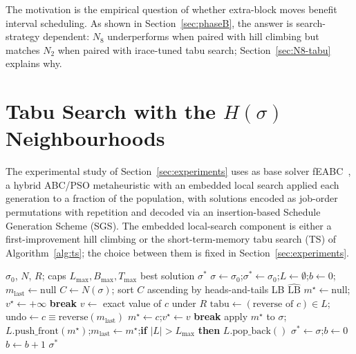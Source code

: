 \documentclass[preprint,12pt]{elsarticle}
\begin{document}
The motivation is the empirical question of whether extra-block moves benefit interval scheduling. As shown in Section~\ref{sec:phaseB}, the answer is search-strategy dependent: $N_8$ underperforms when paired with hill climbing but matches $N_2$ when paired with irace-tuned tabu search; Section~\ref{sec:N8-tabu} explains why.

\section{Tabu Search with the $H(\sigma)$ Neighbourhoods}
\label{sec:ts}

The experimental study of Section~\ref{sec:experiments} uses as base solver fEABC~\cite{DiazFEABC2023}, a hybrid ABC/PSO metaheuristic with an embedded local search applied each generation to a fraction of the population, with solutions encoded as job-order permutations with repetition and decoded via an insertion-based Schedule Generation Scheme (SGS). The embedded local-search component is either a first-improvement hill climbing or the short-term-memory tabu search (TS) of Algorithm~\ref{alg:ts}; the choice between them is fixed in Section~\ref{sec:experiments}.

\begin{algorithm}[H]
\caption{Tabu search with the $H(\sigma)$ neighbourhood (LS\_Tabu).}
\label{alg:ts}
\begin{algorithmic}[1]
\Require $\sigma_0$, $N$, $R$; caps $L_{\max}, B_{\max}, T_{\max}$
\Ensure best solution $\sigma^{\ast}$
\State $\sigma \gets \sigma_0$;\enspace $\sigma^{\ast} \gets \sigma_0$;\enspace $L \gets \emptyset$;\enspace $b \gets 0$;\enspace $m_{\text{last}} \gets \text{null}$
  \State $C \gets N(\sigma)$; sort $C$ ascending by heads-and-tails LB $\widehat{\text{LB}}$
  \State $m^{\star} \gets \text{null}$;\enspace $v^{\star} \gets +\infty$
    \enspace \textbf{break} 
    \EndIf
    \State $v \gets$ exact value of $c$ under $R$
    \State $\text{tabu} \gets (\text{reverse of }c) \in L$;\enspace $\text{undo} \gets c \equiv \text{reverse}(m_{\text{last}})$
      \State $m^{\star} \gets c$;\enspace $v^{\star} \gets v$ 
    \EndIf
  \EndFor
  \enspace \textbf{break} 
  \EndIf
  \State apply $m^{\star}$ to $\sigma$;\enspace $L.\text{push\_front}(m^{\star})$;\enspace $m_{\text{last}} \gets m^{\star}$;\enspace \textbf{if} $|L|>L_{\max}$ \textbf{then} $L.\text{pop\_back}()$
   \State $\sigma^{\ast} \gets \sigma$;\enspace $b \gets 0$
  \Else \State $b \gets b + 1$
  \EndIf
\EndWhile
\State \Return $\sigma^{\ast}$ \label{alg:ts:return}
\end{algorithmic}
\end{algorithm}
\end{document}
